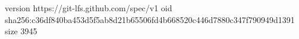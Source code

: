 version https://git-lfs.github.com/spec/v1
oid sha256:c36df840ba453d5f5ab8d21b65506fd4b668520c446d7880c347f790949d1391
size 3945
